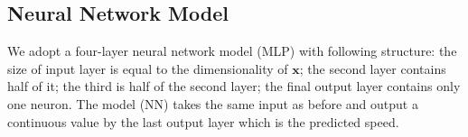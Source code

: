 \subsection{Neural Network Model}
%
We adopt a four-layer neural network model (MLP) with following structure: 
the size of input layer is equal to the dimensionality of $\mathbf{x}$; 
the second layer contains half of it; 
the third is half of the second layer; 
the final output layer contains only one neuron.
The model (NN) takes the same input as before and output a continuous value by the last output layer which is the predicted speed.


%
